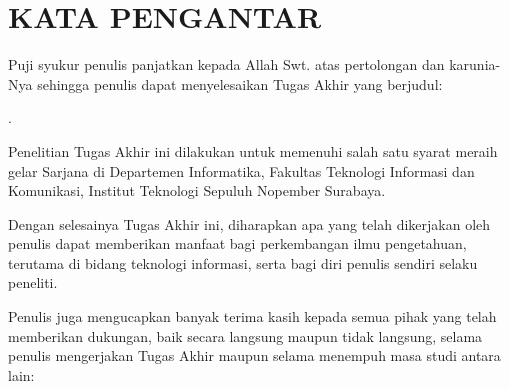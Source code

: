 \chapter{KATA PENGANTAR}
\indent\indent Puji syukur penulis panjatkan kepada Allah Swt. atas pertolongan dan karunia-Nya sehingga penulis dapat menyelesaikan Tugas Akhir yang berjudul:
\begin{center}
	\textbf{\MakeUppercase{\judul}}.
\end{center}

Penelitian Tugas Akhir ini dilakukan untuk memenuhi salah satu syarat meraih gelar Sarjana di Departemen Informatika, Fakultas Teknologi Informasi dan Komunikasi, Institut Teknologi Sepuluh Nopember Surabaya.

Dengan selesainya Tugas Akhir ini, diharapkan apa yang telah dikerjakan oleh penulis dapat memberikan manfaat bagi perkembangan ilmu pengetahuan, terutama di bidang teknologi informasi, serta bagi diri penulis sendiri selaku peneliti.

Penulis juga mengucapkan banyak terima kasih kepada semua pihak yang telah memberikan dukungan, baik secara langsung maupun tidak langsung, selama penulis mengerjakan Tugas Akhir maupun selama menempuh masa studi antara lain:


